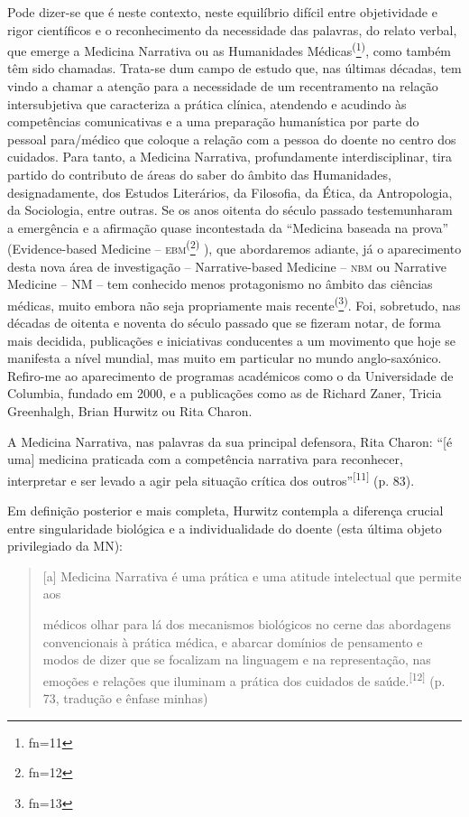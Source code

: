 \documentclass{article}
\makeatletter
\newcommand{\fn}{\afterassignment\fn@aux\count0=}
\newcommand{\fn@aux}{\csname fn\the\count0\endcsname}
\makeatother
\begin{document}
Pode dizer-se que é neste contexto, neste equilíbrio difícil entre objetividade
e rigor científicos e o reconhecimento da necessidade das palavras, do relato
verbal, que emerge a Medicina Narrativa ou as Humanidades
Médicas\textsuperscript{(}\footnote{\fn11}\textsuperscript{)}, como também têm sido chamadas. Trata-se dum campo de estudo que, nas últimas
décadas, tem vindo a chamar a atenção para a necessidade de um recentramento na
relação intersubjetiva que caracteriza a prática clínica, atendendo e acudindo
às competências comunicativas e a uma preparação humanística por parte do
pessoal para/médico que coloque a relação com a pessoa do doente no centro dos
cuidados. Para tanto, a Medicina Narrativa, profundamente interdisciplinar, tira
partido do contributo de áreas do saber do âmbito das Humanidades,
designadamente, dos Estudos Literários, da Filosofia, da Ética, da Antropologia,
da Sociologia, entre outras. Se os anos oitenta do século passado testemunharam
a emergência e a afirmação quase incontestada da “Medicina baseada na prova”
(Evidence-based Medicine – \textsc{ebm}\textsuperscript{(}\footnote{\fn12}\textsuperscript{)}
), que abordaremos adiante, já o aparecimento desta nova área de investigação –
Narrative-based Medicine – \textsc{nbm} ou Narrative Medicine – NM – tem conhecido menos
protagonismo no âmbito das ciências médicas, muito embora não seja propriamente
mais recente\textsuperscript{(}\footnote{\fn13}\textsuperscript{)}. Foi, sobretudo, nas décadas de oitenta e noventa do século passado que se
fizeram notar, de forma mais decidida, publicações e iniciativas conducentes a
um movimento que hoje se manifesta a nível mundial, mas muito em particular no
mundo anglo-saxónico. Refiro-me ao aparecimento de programas académicos como o
da Universidade de Columbia, fundado em 2000, e a publicações como as de Richard
Zaner, Tricia Greenhalgh, Brian Hurwitz ou Rita Charon.

A Medicina Narrativa, nas palavras da sua principal defensora, Rita Charon: “[é
uma] medicina praticada com a competência narrativa para reconhecer, interpretar
e ser levado a agir pela situação crítica dos
outros”\textsuperscript{[}\textsuperscript{11}\textsuperscript{]}
(p. 83).

Em definição posterior e mais completa, Hurwitz contempla a diferença crucial
entre singularidade biológica e a individualidade do doente (esta última objeto
privilegiado da MN):
\begin{quote}

[a] Medicina Narrativa é uma prática e uma atitude intelectual que permite aos

médicos olhar para lá dos mecanismos biológicos no cerne das abordagens
convencionais à prática médica, e abarcar domínios de pensamento e modos de dizer que se focalizam na
linguagem e na representação, nas emoções e relações que iluminam a prática dos
cuidados de saúde.\textsuperscript{[}\textsuperscript{12}\textsuperscript{]}
(p. 73, tradução e ênfase minhas)

\end{quote}
\end{document}
